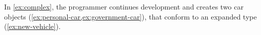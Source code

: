 



In \cref{ex:complex}, 
the programmer continues development and creates two car objects 
(\cref{ex:personal-car,ex:government-car}),
that conform to an expanded  type (\cref{ex:new-vehicle}).



